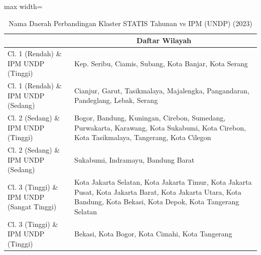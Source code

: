 \begin{table}[H]
\centering
\caption{Nama Daerah Perbandingan Klaster STATIS Tahunan vs IPM (UNDP) (2023)} \label{tab:app2statis_ipm_name_2023}
\begin{adjustbox}{max width=\textwidth}
\begin{tabular}{|>{\centering\arraybackslash}p{4cm}|p{10cm}|}
\hline
\multicolumn{1}{|c|}{\textbf{Kategori}} & \multicolumn{1}{c|}{\textbf{Daftar Wilayah}} \\
\hline
Cl. 1 (Rendah) \& IPM UNDP (Tinggi) & Kep. Seribu, Ciamis, Subang, Kota Banjar, Kota Serang \\
\hline
Cl. 1 (Rendah) \& IPM UNDP (Sedang) & Cianjur, Garut, Tasikmalaya, Majalengka, Pangandaran, Pandeglang, Lebak, Serang \\
\hline
Cl. 2 (Sedang) \& IPM UNDP (Tinggi) & Bogor, Bandung, Kuningan, Cirebon, Sumedang, Purwakarta, Karawang, Kota Sukabumi, Kota Cirebon, Kota Tasikmalaya, Tangerang, Kota Cilegon \\
\hline
Cl. 2 (Sedang) \& IPM UNDP (Sedang) & Sukabumi, Indramayu, Bandung Barat \\
\hline
Cl. 3 (Tinggi) \& IPM UNDP (Sangat Tinggi) & Kota Jakarta Selatan, Kota Jakarta Timur, Kota Jakarta Pusat, Kota Jakarta Barat, Kota Jakarta Utara, Kota Bandung, Kota Bekasi, Kota Depok, Kota Tangerang Selatan \\
\hline
Cl. 3 (Tinggi) \& IPM UNDP (Tinggi) & Bekasi, Kota Bogor, Kota Cimahi, Kota Tangerang \\
\hline
\end{tabular}
\end{adjustbox}
\end{table}